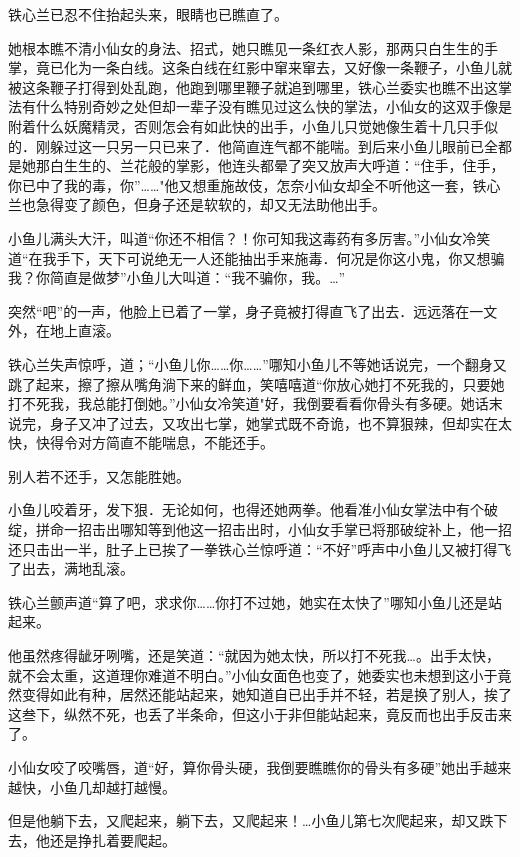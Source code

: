 \documentclass[12pt,oneside]{book}
\begin{document}
铁心兰已忍不住抬起头来，眼睛也已瞧直了。

她根本瞧不清小仙女的身法、招式，她只瞧见一条红衣人影，那两只白生生的手掌，竟已化为一条白线。这条白线在红影中窜来窜去，又好像一条鞭子，小鱼儿就被这条鞭子打得到处乱跑，他跑到哪里鞭子就追到哪里，铁心兰委实也瞧不出这掌法有什么特别奇妙之处但却一辈子没有瞧见过这么快的掌法，小仙女的这双手像是附着什么妖魔精灵，否则怎会有如此快的出手，小鱼儿只觉她像生着十几只手似的．刚躲过这一只另一只已来了．他简直连气都不能喘。到后来小鱼儿眼前已全都是她那白生生的、兰花般的掌影，他连头都晕了突又放声大呼道：``住手，住手，你已中了我的毒，你''\ldots\ldots"他又想重施故伎，怎奈小仙女却全不听他这一套，铁心兰也急得变了颜色，但身子还是软软的，却又无法助他出手。

小鱼儿满头大汗，叫道``你还不相信？！你可知我这毒药有多厉害。''小仙女冷笑道``在我手下，天下可说绝无一人还能抽出手来施毒．何况是你这小鬼，你又想骗我？你简直是做梦''小鱼儿大叫道：``我不骗你，我。\ldots{}''

突然``吧''的一声，他脸上已着了一掌，身子竟被打得直飞了出去．远远落在一文外，在地上直滚。

铁心兰失声惊呼，道；``小鱼儿你\ldots\ldots 你\ldots\ldots{}''哪知小鱼儿不等她话说完，一个翻身又跳了起来，擦了擦从嘴角淌下来的鲜血，笑嘻嘻道``你放心她打不死我的，只要她打不死我，我总能打倒她。''小仙女冷笑道"好，我倒要看看你骨头有多硬。她话末说完，身子又冲了过去，又攻出七掌，她掌式既不奇诡，也不算狠辣，但却实在太快，快得令对方简直不能喘息，不能还手。

别人若不还手，又怎能胜她。

小鱼儿咬着牙，发下狠．无论如何，也得还她两拳。他看准小仙女掌法中有个破绽，拼命一招击出哪知等到他这一招击出时，小仙女手掌已将那破绽补上，他一招还只击出一半，肚子上已挨了一拳铁心兰惊呼道：``不好''呼声中小鱼儿又被打得飞了出去，满地乱滚。

铁心兰颤声道``算了吧，求求你\ldots\ldots 你打不过她，她实在太快了''哪知小鱼儿还是站起来。

他虽然疼得龇牙咧嘴，还是笑道：``就因为她太快，所以打不死我\ldots。出手太快，就不会太重，这道理你难道不明白。''小仙女面色也变了，她委实也未想到这小于竟然变得如此有种，居然还能站起来，她知道自已出手并不轻，若是换了别人，挨了这叁下，纵然不死，也丢了半条命，但这小于非但能站起来，竟反而也出手反击来了。

小仙女咬了咬嘴唇，道``好，算你骨头硬，我倒要瞧瞧你的骨头有多硬''她出手越来越快，小鱼几却越打越慢。

但是他躺下去，又爬起来，躺下去，又爬起来！\ldots 小鱼儿第七次爬起来，却又跌下去，他还是挣扎着要爬起。
\end{document}
